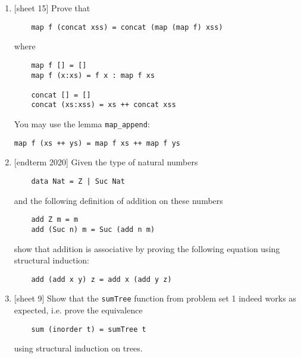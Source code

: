 \documentclass{article}
\def\code#1{\texttt{#1}}
\begin{document}
\begin{enumerate}
    \item {[sheet 15]} Prove that
        \begin{verbatim}
    map f (concat xss) = concat (map (map f) xss)
        \end{verbatim}
        where
        \begin{verbatim}
    map f [] = []
    map f (x:xs) = f x : map f xs

    concat [] = []
    concat (xs:xss) = xs ++ concat xss
        \end{verbatim}
        You may use the lemma \code{map\_append}: \par
        \code{map f (xs ++ ys) = map f xs ++ map f ys}

    \item {[endterm 2020]} Given the type of natural numbers
        \begin{verbatim}
    data Nat = Z | Suc Nat
        \end{verbatim}
        and the following definition of addition on these numbers
        \begin{verbatim}
    add Z m = m
    add (Suc n) m = Suc (add n m)
        \end{verbatim}
        show that addition is associative by proving the following equation using structural induction:
        \begin{verbatim}
    add (add x y) z = add x (add y z)
        \end{verbatim}

    \item {[sheet 9]} Show that the \code{sumTree} function from problem set 1 indeed works as expected, i.e. prove the equivalence
        \begin{verbatim}
    sum (inorder t) = sumTree t
        \end{verbatim}
        using structural induction on trees.
\end{enumerate}
\end{document}
